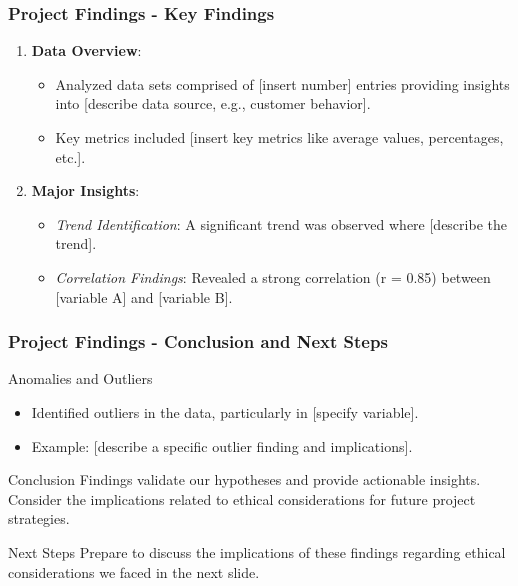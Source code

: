 \documentclass[aspectratio=169]{beamer}
\begin{document}
\begin{frame}[fragile]
    \frametitle{Project Findings - Key Findings}
    \begin{enumerate}
        \item \textbf{Data Overview}:
            \begin{itemize}
                \item Analyzed data sets comprised of [insert number] entries providing insights into [describe data source, e.g., customer behavior].
                \item Key metrics included [insert key metrics like average values, percentages, etc.].
            \end{itemize}
        
        \item \textbf{Major Insights}:
            \begin{itemize}
                \item \textit{Trend Identification}: A significant trend was observed where [describe the trend].
                \item \textit{Correlation Findings}: Revealed a strong correlation (r = 0.85) between [variable A] and [variable B]. 
            \end{itemize}
    \end{enumerate}
\end{frame}

\begin{frame}[fragile]
    \frametitle{Project Findings - Conclusion and Next Steps}
    \begin{block}{Anomalies and Outliers}
        \begin{itemize}
            \item Identified outliers in the data, particularly in [specify variable].
            \item Example: [describe a specific outlier finding and implications].
        \end{itemize}
    \end{block}

    \begin{block}{Conclusion}
        Findings validate our hypotheses and provide actionable insights. Consider the implications related to ethical considerations for future project strategies.
    \end{block}

    \begin{block}{Next Steps}
        Prepare to discuss the implications of these findings regarding ethical considerations we faced in the next slide.
    \end{block}
\end{frame}
\end{document}
